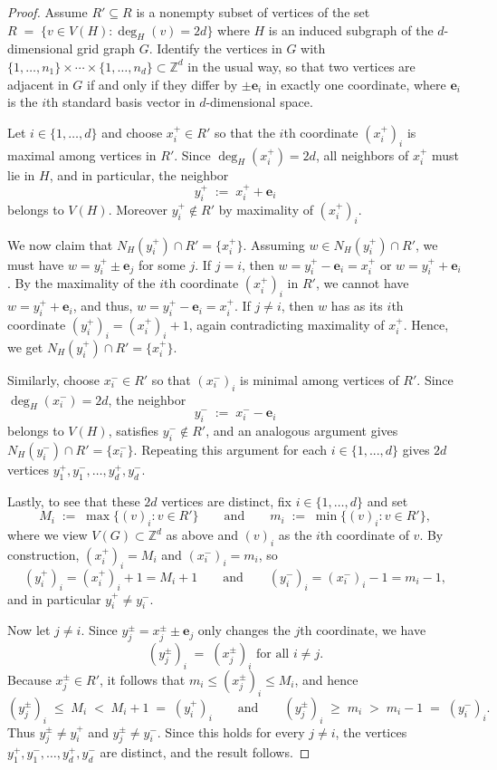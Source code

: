 \documentclass[11pt]{article}
\theoremstyle{plain} \newtheorem{question}{Question}
\theoremstyle{definition}
\begin{document}
\begin{proof}
Assume $R'\subseteq R$ is a nonempty subset of vertices of the set $R \;=\; \{v\in V(H): \deg_H(v)=2d\}$ where $H$ is an induced subgraph of the $d$-dimensional grid graph $G$. Identify the vertices in $G$ with $\{1,\dots,n_1\}\times\cdots\times\{1,\dots,n_d\}\subset \mathbb{Z}^d$ in the usual way, so that
two vertices are adjacent in $G$ if and only if they differ by $\pm \mathbf{e}_i$ in exactly one coordinate, where
$\mathbf{e}_i$ is the $i$th standard basis vector in $d$-dimensional space.

Let $i\in\{1,\dots,d\}$ and choose $x_i^+\in R'$ so that the $i$th coordinate $(x_i^+)_i$ is maximal among vertices in $R'$. Since $\deg_H(x_i^+)=2d$, all neighbors of $x_i^+$ must lie in $H$, and in particular, the neighbor
\[
y_i^+ \;:=\; x_i^+ + \mathbf{e}_i
\]
belongs to $V(H)$. Moreover $y_i^+\notin R'$ by maximality of $(x_i^+)_i$.

We now claim that $N_H(y_i^+)\cap R'=\{x_i^+\}$. Assuming $w\in N_H(y_i^+)\cap R'$, we must have $w=y_i^+\pm \mathbf{e}_j$ for some $j$.
If $j=i$, then $w=y_i^+-\mathbf{e}_i=x_i^+$ or $w=y_i^++\mathbf{e}_i$. By the maximality of the $i$th coordinate $(x_i^+)_i$ in $R'$, we cannot have $w = y_i^++\mathbf{e}_i$, and thus, $w=y_i^+-\mathbf{e}_i=x_i^+$. If $j\neq i$, then $w$ has as its $i$th coordinate $(y_i^+)_i=(x_i^+)_i+1$, again
contradicting maximality of $x_i^+$. Hence, we get $N_H(y_i^+)\cap R'=\{x_i^+\}$.

Similarly, choose $x_i^-\in R'$ so that $(x_i^-)_i$ is minimal among vertices of $R'$. Since $\deg_H(x_i^-)=2d$, the neighbor
\[
y_i^- \;:=\; x_i^- - \mathbf{e}_i
\]
belongs to $V(H)$, satisfies $y_i^-\notin R'$, and an analogous argument gives $N_H(y_i^-)\cap R'=\{x_i^-\}$. Repeating this argument for each $i\in \{1, ... , d\}$ gives $2d$ vertices  $y_1^+,y_1^-,\dots,y_d^+,y_d^-$. 

Lastly, to see that these $2d$ vertices are distinct, fix $i\in\{1,\dots,d\}$ and set
\[
M_i \;:=\; \max\{(v)_i : v\in R'\}
\qquad\text{and}\qquad
m_i \;:=\; \min\{(v)_i : v\in R'\},
\]
where we view $V(G)\subset\mathbb{Z}^d$ as above and $(v)_i$ as the $i$th coordinate of $v$. By construction, $(x_i^+)_i=M_i$ and $(x_i^-)_i=m_i$, so
\[
(y_i^+)_i=(x_i^+)_i+1=M_i+1
\qquad\text{and}\qquad
(y_i^-)_i=(x_i^-)_i-1=m_i-1,
\]
and in particular $y_i^+\neq y_i^-$.

Now let $j\neq i$. Since $y_j^\pm=x_j^\pm\pm \mathbf e_j$ only changes the $j$th coordinate, we have
\[
(y_j^\pm)_i \;=\; (x_j^\pm)_i \text{ for all } i\ne j.
\]
Because $x_j^\pm\in R'$, it follows that $m_i \le (x_j^\pm)_i \le M_i$, and hence
\[
(y_j^\pm)_i \;\le\; M_i \;<\; M_i+1 \;=\; (y_i^+)_i
\qquad\text{and}\qquad
(y_j^\pm)_i \;\ge\; m_i \;>\; m_i-1 \;=\; (y_i^-)_i.
\]
Thus $y_j^\pm \neq y_i^+$ and $y_j^\pm \neq y_i^-$. Since this holds for every $j\neq i$,
the vertices $y_1^+,y_1^-,\dots,y_d^+,y_d^-$ are distinct, and the result follows.


\end{proof}
\end{document}
